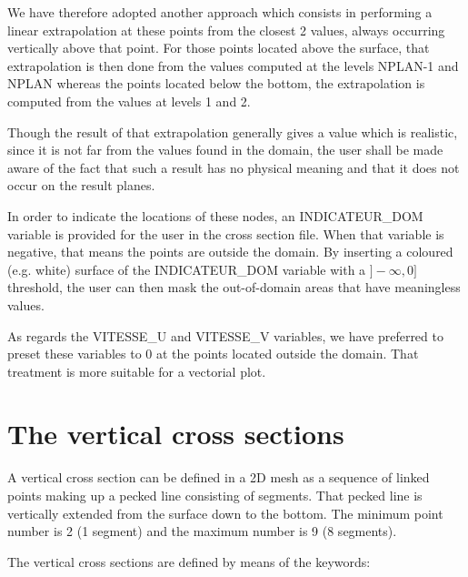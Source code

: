 We have therefore adopted another approach which consists in performing a
linear extrapolation at these points from the closest 2 values, always
occurring vertically above that point. For those points located above the
surface, that extrapolation is then done from the values computed at the levels
NPLAN-1 and NPLAN whereas the points located below the bottom, the
extrapolation is computed from the values at levels 1 and 2.

Though the result of that extrapolation generally gives a value which is
realistic, since it is not far from the values found in the domain, the user
shall be made aware of the fact that such a result has no physical meaning and
that it does not occur on the result planes.

In order to indicate the locations of these nodes, an INDICATEUR\_DOM variable
is provided for the user in the cross section file. When that variable is
negative, that means the points are outside the domain. By inserting a coloured
(e.g. white) surface of the INDICATEUR\_DOM variable with a $]-\infty, 0]$
threshold, the user can then mask the out-of-domain areas that have meaningless
values.

As regards the VITESSE\_U and VITESSE\_V variables, we have preferred to preset
these variables to 0 at the points located outside the domain. That treatment
is more suitable for a vectorial plot.

\chapter{The vertical cross sections}

A vertical cross section can be defined in a 2D mesh as a sequence of linked
points making up a pecked line consisting of segments. That pecked line is
vertically extended from the surface down to the bottom. The minimum point
number is 2 (1 segment) and the maximum number is 9 (8 segments).

The vertical cross sections are defined by means of the keywords:

